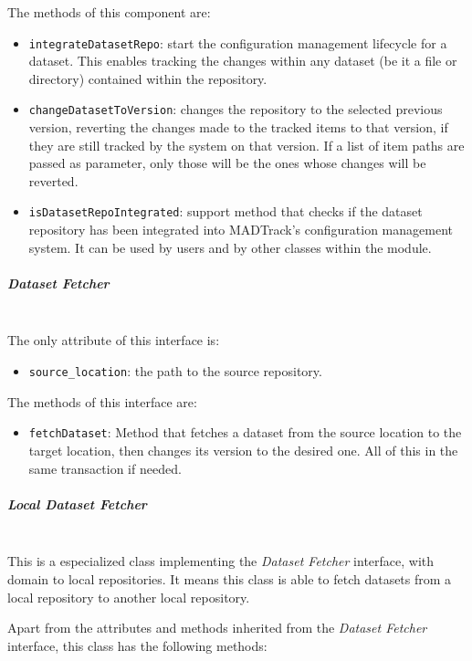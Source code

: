 The methods of this component are:

\begin{itemize}
    \item \texttt{integrateDatasetRepo}: start the configuration management lifecycle for a dataset. This enables tracking the changes within any dataset (be it a 
    file or directory) contained within the repository.

    \item \texttt{changeDatasetToVersion}: changes the repository to the selected previous version, reverting the changes made to the tracked items to that version, 
    if they are still tracked by the system on that version. If a list of item paths are passed as parameter, only those will be the ones whose changes will be 
    reverted.

    \item \texttt{isDatasetRepoIntegrated}: support method that checks if the dataset repository has been integrated into MADTrack's configuration management system. 
    It can be used by users and by other classes within the module.

\end{itemize}

\subparagraph{Dataset Fetcher}\mbox{}\\

The only attribute of this interface is:

\begin{itemize}
    \item \texttt{source\_location}: the path to the source repository.
\end{itemize}

The methods of this interface are:

\begin{itemize}
    \item \texttt{fetchDataset}: Method that fetches a dataset from the source location to the target location, then changes its version to the desired one. All of this
    in the same transaction if needed.
\end{itemize}

\subparagraph{Local Dataset Fetcher}\mbox{}\\

This is a especialized class implementing the \emph{Dataset Fetcher} interface, with domain to local repositories. It means this class is able to fetch datasets from a local 
repository to another local repository.

Apart from the attributes and methods inherited from the \emph{Dataset Fetcher} interface, this class has the following methods:

